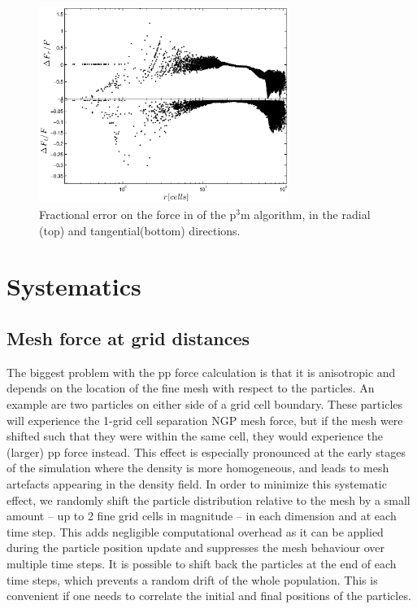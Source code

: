 \begin{figure}%
  \begin{center}
    \includegraphics[width=3.2in]{graphs/densityForce_fracErr.eps}
  \caption{Fractional error on the force in of the p$^3$m algorithm, in the radial (top) and tangential(bottom) directions.
    \label{fig:den_force_fracErr}}
\end{center}
\end{figure}


\section{Systematics}
\label{sec:systematics}

\subsection{Mesh force at grid distances}

The biggest problem with the pp force calculation is that it 
is anisotropic and depends on the location of the fine mesh with respect 
to the particles. An example are two particles on either side of a grid 
cell boundary. These particles will experience the 1-grid cell separation
NGP mesh force, but if the mesh were shifted such that they were
within the same cell, they would experience the (larger) pp force instead. 
This effect is especially pronounced at the early stages of the simulation where
the density is more homogeneous, and leads to mesh artefacts appearing
in the density field. In order to minimize this systematic effect, 
we randomly shift the particle distribution relative to the mesh by a small
amount -- up to 2 fine grid cells in magnitude -- in each
dimension and at each time step.  This adds negligible computational
overhead as it can be applied during the particle position update
and suppresses the mesh behaviour over multiple time steps.
It is possible to shift back the particles at the end of each time steps,
which prevents a random drift of the whole population.
This is convenient if one needs to correlate the initial and final positions of the particles.
 
